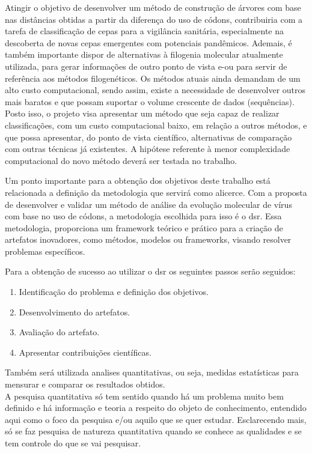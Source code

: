 Atingir o objetivo de desenvolver um método de construção de árvores com base nas distâncias obtidas a partir da diferença do uso de códons, contribuiria com a tarefa de classificação de cepas para a vigilância sanitária, especialmente na descoberta de novas cepas emergentes com potenciais pandêmicos. Ademais, é também importante dispor de alternativas à filogenia molecular atualmente utilizada, para gerar informações de outro ponto de vista e-ou para servir de referência aos métodos filogenéticos.
Os métodos atuais ainda demandam de um alto custo computacional, sendo assim, existe a necessidade de desenvolver outros mais baratos e que possam suportar o volume crescente de dados (sequências).
Posto isso, o projeto visa apresentar um método que seja capaz de realizar classificações, com um custo computacional baixo, em relação a outros métodos, e que possa apresentar, do ponto de vista científico, alternativas de comparação com outras técnicas já existentes. A hipótese referente à menor complexidade computacional do novo método deverá ser testada no trabalho.

Um ponto importante para a obtenção dos objetivos deste trabalho está relacionada a definição da metodologia que servirá como alicerce. Com a proposta de desenvolver e validar um método de análise da evolução molecular de vírus com base no uso de códons, a metodologia escolhida para isso é o \gls{dsr}. Essa metodologia, proporciona um framework teórico e prático para a criação de artefatos inovadores, como métodos, modelos ou frameworks, visando resolver problemas específicos.\cite{peffers_dsr_2007}

Para a obtenção de sucesso ao utilizar o \gls{dsr} os seguintes passos serão seguidos:
\begin{enumerate}
  \item Identificação do problema e definição dos objetivos.
  \item Desenvolvimento do artefatos.
  \item Avaliação do artefato.
  \item Apresentar contribuições científicas.
\end{enumerate}

Também será utilizada analises quantitativas, ou seja, medidas estatísticas para mensurar e comparar os resultados obtidos.\\
A pesquisa quantitativa só tem sentido quando há um problema muito bem definido e há informação e teoria a respeito do objeto de conhecimento, entendido aqui como o foco da pesquisa e/ou aquilo que se quer estudar. Esclarecendo mais, só se faz pesquisa de natureza quantitativa quando se conhece as qualidades e se tem controle do que se vai pesquisar.\cite{da_silva_pesquisa_2014}

